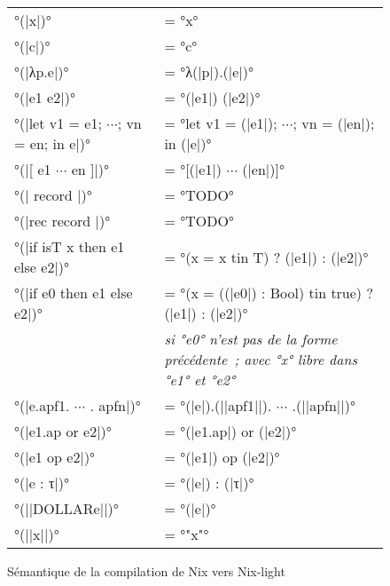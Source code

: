 \begin{figure}
  \begin{tabular}{ll}
    °(|x|)° &= °x° \\
    °(|c|)° &= °c°\\
    °(|λp.e|)° &= °λ(|p|).(|e|)°\\
    °(|e1 e2|)° &= °(|e1|) (|e2|)°\\
    °(|let v1 = e1; $\cdots$; vn = en; in e|)° &=
      °let v1 = (|e1|); $\cdots$; vn = (|en|); in (|e|)°\\
    °(|[ e1 $\cdots$ en ]|)° &= °[(|e1|) $\cdots$ (|en|)]°\\
    °(|{ record }|)° &= °TODO°\\
    °(|rec { record }|)° &= °TODO°\\
    °(|if isT x then e1 else e2|)° &= °(x = x tin T) ? (|e1|) : (|e2|)°\\
    °(|if e0 then e1 else e2|)° &=
      °(x = ((|e0|) : Bool) tin true) ? (|e1|) : (|e2|)°\\
    &{\itshape
      si °e0° n'est pas de la forme précédente ;
      avec °x° libre dans °e1° et °e2°}\\
    °(|e.apf1. $\cdots$ . apfn|)° &= °(|e|).(||apf1||). $\cdots$ .(||apfn||)°\\
    °(|e1.ap or e2|)° &= °(|e1.ap|) or (|e2|)°\\
    °(|e1 op e2|)° &= °(|e1|) op (|e2|)°\\
    °(|e : τ|)° &= °(|e|) : (|τ|)°\\

    °(||DOLLAR{e}||)° &= °(|e|)°\\
    °(||x||)° &= °"x"°
  \end{tabular}
  \caption{Sémantique de la compilation de Nix vers Nix-light}\label{nix-light::compilation}
\end{figure}

